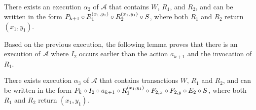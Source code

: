 \begin{lemma} \label{lem:exec3_alpha2} 
\sloppy There exists an execution $\alpha_2$  of $\mathcal{A}$ that contains 
$W$, $R_1$, and $R_2$, and can be written in the form 
$\finiteprefixA{k}{k+1} \circ 
\frage{R_1}{}{x_1, y_1}
 \circ
 \frage{R_2}{}{x_1, y_1}
\circ \fragt{S}{\alpha_2}{}$, where both $R_1$ and $R_2$ return $(x_1, y_1)$.
\end{lemma}



Based on the previous execution, the following lemma proves that there is an execution of 
$\mathcal{A}$ where $I_2$ occurs earlier than the action $a_{k+1}$ and the invocation of  $R_1$.
\begin{lemma} \label{lem:exec3_alpha3} 
\sloppy There exists  execution $\alpha_3$  of $\mathcal{A}$ that contains transactions $W$, $R_1$ and $R_2$, and can be written in the form  
$\finiteprefixA{k-1}{k} \circ  \fragt{I_2}{\alpha_3}{} \circ  a_{k+1} \circ 
\frage{R_1}{}{x_1, y_1}
\circ \fragn{F_{2,x}}{\alpha_3}{x_1} \circ \fragn{F_{2,y}}{\alpha_3}{y_1} \circ \fragn{E_2}{\alpha_3}{x_1, y_1}
\circ \fragt{S}{\alpha_3}{}$,  where both $R_1$ and $R_2$ return $(x_1, y_1)$.
\end{lemma}


